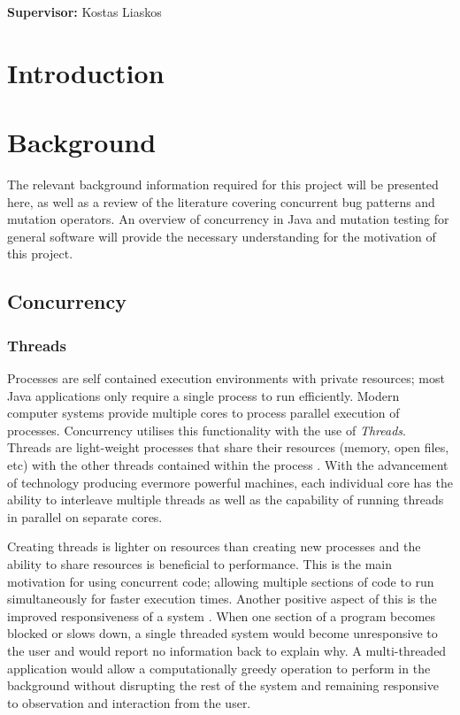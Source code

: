 \documentclass[a4paper,12pt]{article}
\begin{document}
\vfill
{\bf Supervisor:} Kostas Liaskos             %
\hfill
\newpage

%
\pagestyle{plain}                               %
\setcounter{page}{1}                            %
\tableofcontents                                %

\newpage
\section{Introduction}

\newpage
\section{Background}

The relevant background information required for this project will be presented here, as well as a review of the literature covering concurrent bug patterns and mutation operators. An overview of concurrency in Java and mutation testing for general software will provide the necessary understanding for the motivation of this project.  


\subsection{Concurrency}
\subsubsection{Threads}

Processes are self contained execution environments with private resources; most Java applications only require a single process to run efficiently. Modern computer systems provide multiple cores to process parallel execution of processes. Concurrency utilises this functionality with the use of \textit{Threads}. Threads are light-weight processes that share their resources (memory, open files, etc) with the other threads contained within the process \citep{mois15}. With the advancement of technology producing evermore powerful machines, each individual core has the ability to interleave multiple threads as well as the capability of running threads in parallel on separate cores. 

Creating threads is lighter on resources than creating new processes and the ability to share resources is beneficial to performance. This is the main motivation for using concurrent code; allowing multiple sections of code to run simultaneously for faster execution times. Another positive aspect of this is the improved responsiveness of a system \citep{peierls05}. When one section of a program becomes blocked or slows down, a single threaded system would become unresponsive to the user and would report no information back to explain why. A multi-threaded application would allow a computationally greedy operation to perform in the background without disrupting the rest of the system and remaining responsive to observation and interaction from the user.
\end{document}
